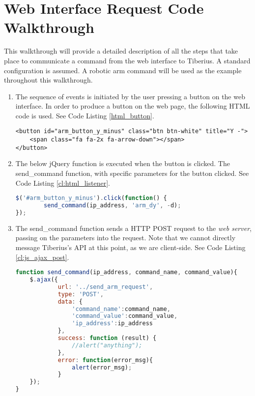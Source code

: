 \chapter{Web Interface Request Code Walkthrough}
\label{app:web_walkthrough}
\pagestyle{cameron}

This walkthrough will provide a detailed description of all the steps that take place to communicate a command from the web interface to Tiberius. A standard configuration is assumed. A robotic arm command will be used as the example throughout this walkthrough.
\newline

\begin{enumerate}

\item The sequence of events is initiated by the user pressing a button on the web interface. In order to produce a button on the web page, the following \gls{HTML} code is used. See Code Listing \ref{html_button}. 
\newline

\begin{lstlisting}[caption=HTML Button, label=html_button]
<button id="arm_button_y_minus" class="btn btn-white" title="Y -">
    <span class="fa fa-2x fa-arrow-down"></span>
</button>
\end{lstlisting}

\item The below jQuery function is executed when the button is clicked. The send\_command function, with specific parameters for the button clicked. See Code Listing \ref{cl:html_listener}.
\newline

\begin{lstlisting}[language=JavaScript, caption=jQuery Click Listener, label=cl:button_listener]
$('#arm_button_y_minus').click(function() {
		send_command(ip_address, 'arm_dy', -d);
});
\end{lstlisting}

\item The send\_command function sends a \gls{HTTP} \gls{POST} request to the \textit{web server}, passing on the parameters into the request. Note that we cannot directly message Tiberius's API at this point, as we are client-side. See Code Listing \ref{cl:js_ajax_post}.
\newline

\begin{lstlisting}[language=JavaScript, caption=Javascript message to web server, label=cl:js_ajax_post]
function send_command(ip_address, command_name, command_value){
	$.ajax({
			url: '../send_arm_request',
			type: 'POST',
			data: {
				'command_name':command_name,
				'command_value':command_value,
				'ip_address':ip_address
			},
			success: function (result) {
				//alert("anything");
			},
			error: function(error_msg){
				alert(error_msg);
			}
	});
}
\end{lstlisting}


\end{enumerate}
